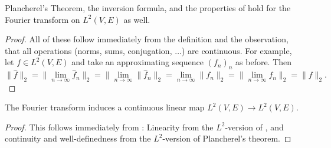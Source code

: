 \begin{corollary}
  \label{thm:fourier2-properties}
  \lean{}
  Plancherel's Theorem, the inversion formula, and the properties of  hold
  for the Fourier transform on $L^2(V,E)$ as well.
\end{corollary}
\begin{proof}
  All of these follow immediately from the definition and the observation, that all operations (norms, sums, conjugation, $\ldots$) are continuous.
  For example, let $f\in L^2(V,E)$ and take an approximating sequence $(f_n)_n$ as before. Then
  $$\|\widehat f\|_2=\|\lim_{n\to\infty}\widehat f_n\|_2=\|\lim_{n\to\infty}\|\widehat f_n\|_2=\lim_{n\to\infty}\|f_n\|_2
  =\|\lim_{n\to\infty}f_n\|_2=\|f\|_2.$$
\end{proof}

\begin{corollary}
  \label{thm:fourier-is-l2-linear}
  \leanok
  The Fourier transform induces a continuous linear map $L^2(V,E) \to L^2(V,E)$.
  \end{corollary}
  \begin{proof}
    This follows immediately from : Linearity from the $L^2$-version of
    , and continuity and well-definedness from the $L^2$-version of Plancherel's theorem.
\end{proof}